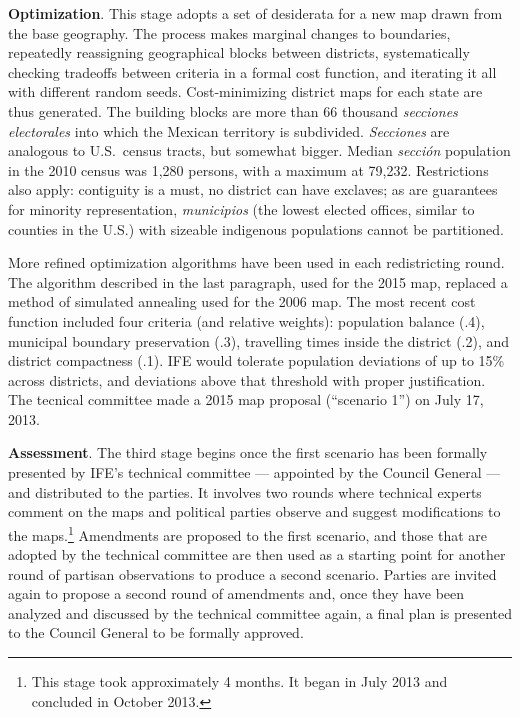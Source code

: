 \documentclass[letter,12pt]{article}
\begin{document}
\textbf{Optimization}. This stage adopts a set of desiderata for a new map drawn from the base geography. The process makes marginal changes to boundaries, repeatedly reassigning geographical blocks between districts, systematically checking tradeoffs between criteria in a formal cost function, and iterating it all with different random seeds. Cost-minimizing district maps for each state are thus generated. The building blocks are more than 66 thousand \emph{secciones electorales} into which the Mexican territory is subdivided. \emph{Secciones} are analogous to U.S.\ census tracts, but somewhat bigger. Median \emph{secci\'on} population in the 2010 census was 1,280 persons, with a maximum at 79,232. Restrictions also apply: contiguity is a must, no district can have exclaves; as are guarantees for minority representation, \emph{municipios} (the lowest elected offices, similar to counties in the U.S.) with sizeable indigenous populations cannot be partitioned. 

More refined optimization algorithms have been used in each redistricting round. The algorithm described in the last paragraph, used for the 2015 map, replaced a method of simulated annealing used for the 2006 map. The most recent cost function included four criteria (and relative weights): population balance (.4), municipal boundary preservation (.3), travelling times inside the district (.2), and district compactness (.1). IFE would tolerate population deviations of up to 15\% across districts, and deviations above that threshold with proper justification. The tecnical committee made a 2015 map proposal (``scenario 1'') on July 17, 2013. 

\textbf{Assessment}. The third stage begins once the first scenario has been formally presented by IFE's technical committee --- appointed by the Council General --- and distributed to the parties. It involves two rounds where technical experts comment on the maps and political parties observe and suggest modifications to the maps.\footnote{This stage took approximately 4 months. It began in July 2013 and concluded in October 2013.} Amendments are proposed to the first scenario, and those that are adopted by the technical committee are then used as a starting point for another round of partisan observations to produce a second scenario. Parties are invited again to propose a second round of amendments and, once they have been analyzed and discussed by the technical committee again, a final plan is presented to the Council General to be formally approved.
\end{document}
